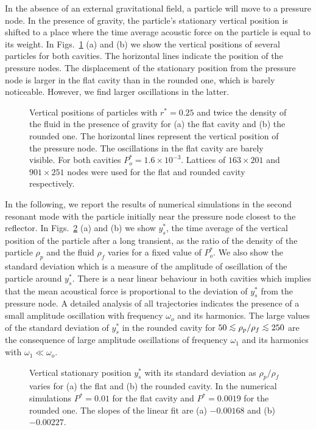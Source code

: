 In the absence of an external gravitational field, a particle will move to a pressure 
node. In the presence of gravity, the particle's stationary 
vertical position is shifted to a place where the time average acoustic force on the 
particle is equal to its weight. In Figs.~\ref{fig:path-3} 
(a) and (b) we show the vertical positions of several particles for both cavities. 
The horizontal lines indicate the position of the pressure nodes. The displacement of the
stationary position from the pressure node is larger in the flat cavity than in 
the rounded one, which is barely noticeable. However, we find larger oscillations in 
the latter.
%
\begin{figure}


\vskip 5mm
\caption{\label{fig:path-3}
 Vertical positions of particles with $r^\ast=0.25$ and twice the 
 density of the fluid in the presence of gravity for (a) the flat cavity and (b) the 
 rounded one. The horizontal lines represent the vertical position of the pressure node. 
 The oscillations in the flat cavity are barely visible. 
 For both cavities $P_o^\ast = 1.6\times 10^{-3}$. Lattices of $163\times 201$ and 
 $901\times 251$ nodes were used for the flat and rounded cavity respectively.}
\end{figure}

In the following, we report the results of numerical simulations in the second
resonant mode with the particle initially near the pressure node closest to the reflector.
In Figs.~\ref{fig:barrido-rho} (a) and (b) we show  $y_s^\ast$, the time average of 
the vertical position of the particle after a long transient, as the ratio of
the density of the particle $\rho_p$ and the fluid $\rho_f$
varies for a fixed value of $P_o^\ast$. We also show the standard 
deviation which is a measure of the amplitude of oscillation of the particle around 
$y_s^\ast$. There is a near linear behaviour in both cavities which implies that the 
mean acoustical force is proportional to the deviation of $y_s^\ast$ from the 
pressure node. A detailed analysis of all trajectories indicates the presence of a 
small amplitude oscillation with frequency $\omega_o$ and its harmonics. The large 
values of the standard deviation of $y_s^\ast$ in the rounded cavity for 
$50\lsim\rho_p/\rho_f\lsim 250$ are the consequence of large amplitude oscillations of 
frequency $\omega_1$ and its harmonics with $\omega_1\ll\omega_o$. 
%
\begin{figure}


\caption{\label{fig:barrido-rho}
 Vertical stationary position $y_s^\ast$ with its standard deviation as $\rho_p/\rho_f$ 
 varies for (a) the flat and (b) the rounded cavity. In the numerical simulations 
 $P^\ast=0.01$ for the flat cavity and $P^\ast=0.0019$ for the rounded one. The slopes 
 of the linear fit are (a) $-0.00168$ and (b) $-0.00227$. 
}
\end{figure}

